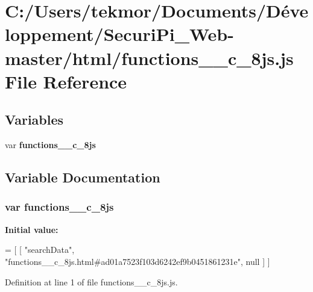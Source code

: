 \section{C\+:/\+Users/tekmor/\+Documents/\+Développement/\+Securi\+Pi\+\_\+\+Web-\/master/html/functions\+\_\+\+\_\+c\+\_\+8js.js File Reference}
\label{functions____c__8js_8js}
\subsection*{Variables}
\begin{DoxyCompactItemize}
\item 
var {\bf functions\+\_\+\+\_\+c\+\_\+8js}
\end{DoxyCompactItemize}


\subsection{Variable Documentation}
\subsubsection[{functions\+\_\+\+\_\+c\+\_\+8js}]{\setlength{\rightskip}{0pt plus 5cm}var functions\+\_\+\+\_\+c\+\_\+8js}\label{functions____c__8js_8js_a2a723daeb8d6a8717387957d5b236695}
{\bfseries Initial value\+:}
\begin{DoxyCode}
=
[
    [ \textcolor{stringliteral}{"searchData"}, \textcolor{stringliteral}{"functions\_\_c\_8js.html#ad01a7523f103d6242ef9b0451861231e"}, null ]
]
\end{DoxyCode}


Definition at line 1 of file functions\+\_\+\+\_\+c\+\_\+8js.\+js.

